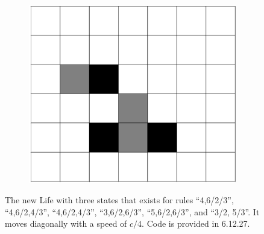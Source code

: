 \documentclass[12pt]{article}
\numberwithin{figure}{section} %
\begin{document}
\begin{figure}[H]
\begin{subfigure}{0.18\textwidth}
   	\end{subfigure}
        \begin{subfigure}{0.18\textwidth}
     	\centering
     	\includegraphics[width=\linewidth]{Section4/30.4}
     	\subcaption{}
   \end{subfigure}

   \caption{The new Life with three states that exists for rules “4,6/2/3”, “4,6/2,4/3”, “4,6/2,4/3”, “3,6/2,6/3”, “5,6/2,6/3”, and “3/2, 5/3”. It moves diagonally with a speed of $c/4$. Code is provided in 6.12.27.}
   \label{fig:the new life}
      \vspace{-1.5em}
\end{figure}
\end{document}
